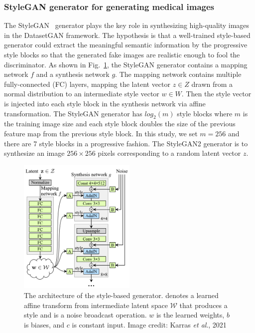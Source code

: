 \documentclass[conference]{IEEEtran}
\newcommand{\etal}{\textit{et al}.}
\begin{document}
\subsubsection{StyleGAN generator for generating medical images}
\label{sec:stylegan}
The StyleGAN~\cite{Karras2019ASG} generator plays the key role in synthesizing high-quality images in the DatasetGAN framework. 
The hypothesis is that a well-trained style-based generator could extract the meaningful semantic information by the progressive style blocks so that the generated fake images are realistic enough to fool the discriminator. 
As shown in Fig.~\ref{fig:stylegan}, the StyleGAN generator contains a mapping network $f$ and a synthesis network $g$. The mapping network contains multiple fully-connected (FC) layers, mapping the latent vector $z\in Z$ drawn from a normal distribution to an intermediate style vector $w\in W$. 
Then the style vector is injected into each style block in the synthesis network via affine transformation. 
The StyleGAN generator has $log_2(m)$ style blocks where $m$ is the training image size and each style block doubles the size of the previous feature map from the previous style block. 
In this study, we set $m=256$ and there are 7 style blocks in a progressive fashion. The StyleGAN2 generator is to synthesize an image $256\times 256$ pixels corresponding to a random latent vector $z$.

\begin{figure}[!ht]
  \includegraphics[width=0.5\textwidth]{./fig/stylegan_arch.png} 
  \caption{The architecture of the style-based generator.  denotes a learned affine transform from intermediate latent space $\mathcal{W}$ that produces a style and  is a noise broadcast operation.
  $w$ is the learned weights, $b$ is biases, and $c$ is constant input. Image credit: Karras \etal, 2021\cite{Karras2019ASG}}
  \label{fig:stylegan}
\end{figure}
\end{document}
